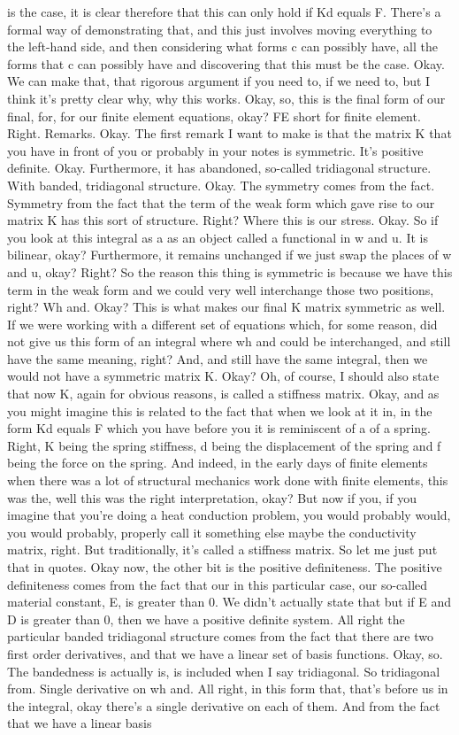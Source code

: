 \documentclass[10pt]{article}
\begin{document}
is the case, it is clear therefore that this can only hold if Kd equals F. There's a formal way of demonstrating that, and this just involves moving everything to the left-hand side, and then considering what forms c can possibly have, all the forms that c can possibly have and discovering that this must be the case. Okay. We can make that, that rigorous argument if you need to, if we need to, but I think it's pretty clear why, why this works. Okay, so, this is the final form of our final, for, for our finite element equations, okay? FE short for finite element. Right. Remarks. Okay. The first remark I want to make is that the matrix K that you have in front of you or probably in your notes is symmetric. It's positive definite. Okay. Furthermore, it has abandoned, so-called tridiagonal structure. With  banded, tridiagonal structure. Okay. The symmetry comes from the fact. Symmetry from the fact that the term of the weak form which gave rise to our matrix K has this sort of structure. Right? Where this is our stress. Okay. So if you look at this integral as a as an object called a functional in w and u. It is bilinear, okay? Furthermore, it remains unchanged if we just swap the places of w and u, okay? Right? So the reason this thing is symmetric is because we have this term in the weak form and we could very well interchange those two positions, right? Wh and. Okay? This is what makes our final K matrix symmetric as well. If we were working with a different set of equations which, for some reason, did not give us this form of an integral where wh and could be interchanged, and still have the same meaning, right? And, and still have the same integral, then we would not have a symmetric matrix K. Okay? Oh, of course, I should also state that now K, again for obvious reasons, is called a stiffness matrix. Okay, and as you might imagine this is related to the fact that when we look at it in, in the form Kd equals F which you have before you it is reminiscent of a of a spring. Right, K being the spring stiffness, d being the displacement of the spring and f being the force on the spring. And indeed, in the early days of finite elements when there was a lot of structural mechanics work done with finite elements, this was the, well this was the right interpretation, okay? But now if you, if you imagine that you're doing a heat conduction problem, you would probably would, you would probably, properly call it something else maybe the conductivity matrix, right. But traditionally, it's called a stiffness matrix. So let me just put that in quotes. Okay now, the other bit is the positive definiteness. The positive definiteness comes from the fact that our in this particular case, our so-called material constant, E, is greater than 0. We didn't actually state that but if E and D is greater than 0, then we have a positive definite system. All right the particular banded tridiagonal structure comes from the fact that there are two first order derivatives, and that we have a linear set of basis functions. Okay, so. The bandedness is actually is, is included when I say tridiagonal. So tridiagonal from. Single derivative on wh and. All right, in this form that, that's before us in the integral, okay there's a single derivative on each of them. And from the fact that we have a linear basis 
\end{document}

